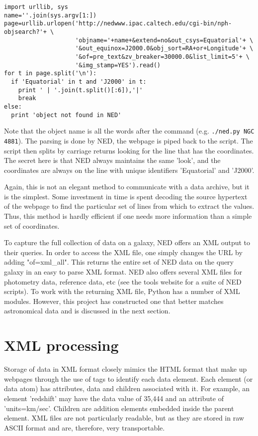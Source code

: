 \documentclass[11pt,preprint,graphicx]{aastex}
\begin{document}
\begin{verbatim}
import urllib, sys
name=''.join(sys.argv[1:])
page=urllib.urlopen('http://nedwww.ipac.caltech.edu/cgi-bin/nph-objsearch?'+ \
                    'objname='+name+&extend=no&out_csys=Equatorial'+ \
                    '&out_equinox=J2000.0&obj_sort=RA+or+Longitude'+ \
                    '&of=pre_text&zv_breaker=30000.0&list_limit=5'+ \
                    '&img_stamp=YES').read()
for t in page.split('\n'):
  if 'Equatorial' in t and 'J2000' in t:
    print ' | '.join(t.split()[:6]),'|'
    break
else:
  print 'object not found in NED'
\end{verbatim}

\noindent Note that the object name is all the words after the command
(e.g. {\tt ./ned.py NGC 4881}).  The parsing is done by NED, the webpage is
piped back to the script.  The script then splits by carriage returns
looking for the line that has the coordinates.  The secret here is that NED
always maintains the same 'look', and the coordinates are always on the
line with unique identifiers 'Equatorial' and 'J2000'.

\noindent Again, this is not an elegant method to communicate with a data
archive, but it is the simplest.  Some investment in time is spent decoding the
source hypertext of the webpage to find the particular set of lines from
which to extract the values.  Thus, this method is hardly efficient if one
needs more information than a simple set of coordinates.

\noindent To capture the full collection of data on a galaxy, NED offers an
XML output to their queries.  In order to access the XML file, one simply
changes the URL by adding "of=xml\_all".  This returns the entire set of
NED data on the query galaxy in an easy to parse XML format.  NED also
offers several XML files for photometry data, reference data, etc (see the
tools website for a suite of NED scripts).  To work with the returning XML
file, Python has a number of XML modules.  However, this project has
constructed one that better matches astronomical data and is discussed in
the next section.

\section{XML processing}

\noindent Storage of data in XML format closely mimics the HTML format that
make up webpages through the use of tags to identify each data element.
Each element (or data atom) has attributes, data and children associated
with it.  For example, an element 'redshift' may have the data value of
35,444 and an attribute of 'units=km/sec'.  Children are addition elements
embedded inside the parent element.  XML files are not particularly
readable, but as they are stored in raw ASCII format and are, therefore,
very transportable.
\end{document}
